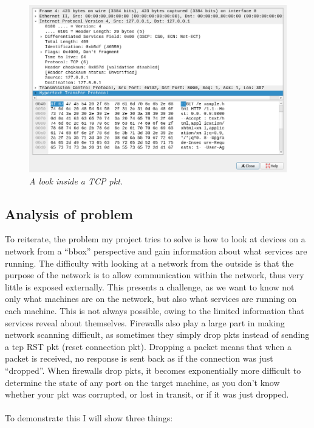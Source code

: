 \documentclass[titlepage]{article}
\let\Oldsubsection\subsection{}
\renewcommand{\subsection}{\FloatBarrier\Oldsubsection}
\begin{document}
\begin{figure}[H]
  \centering
  \includegraphics[width=\textwidth]{deconstructed_packet.png}
  \caption{\textit{%
    A look inside a TCP \gls{pkt}.
}}\label{deconstructed}
\end{figure}

\lstset{language=HTML}
  

\subsection{Analysis of problem}

To reiterate, the problem my project tries to solve is how to look at devices on a network from a 
``\gls{bbox}'' perspective and gain information about what \glspl{service} are running.
The difficulty with looking at a network from the outside is that the purpose of the network is to 
allow communication within the network, thus very little is exposed externally. This presents a 
challenge, as we want to know not only what machines are on the network, but also what
services are running on each machine.
This is not always possible, owing to the limited information that \glspl{service} reveal about 
themselves. Firewalls also play a large part in making network scanning difficult, as sometimes they 
simply drop \glspl{pkt} instead of sending a \gls{tcp} RST \gls{pkt} (reset connection \gls{pkt}). 
Dropping a packet means that when a packet is received, no response is sent back \textendash{}
as if the connection was just ``dropped''.
When firewalls drop \glspl{pkt}, it becomes exponentially more difficult to determine the
state of any port on the target machine, as you don't know whether 
your \gls{pkt} was corrupted, or lost in transit, or if it was just dropped.
 \\\\ To demonstrate this 
I will show three things:
\end{document}
